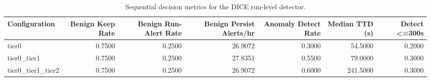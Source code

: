\begin{table}[t]
\centering
\caption{Sequential decision metrics for the DICE run-level detector.}
\label{tab:dice_sequential_metrics}
\footnotesize
\begin{tabular}{lrrrrrr}
\toprule
Configuration & Benign Keep Rate & Benign Run-Alert Rate & Benign Persist Alerts/hr & Anomaly Detect Rate & Median TTD (s) & Detect <=300s \\
\midrule
tier0 & 0.7500 & 0.2500 & 26.9072 & 0.3000 & 54.5000 & 0.2000 \\
tier0_tier1 & 0.7500 & 0.2500 & 27.8351 & 0.5500 & 79.0000 & 0.3000 \\
tier0_tier1_tier2 & 0.7500 & 0.2500 & 26.9072 & 0.6000 & 241.5000 & 0.3000 \\
\bottomrule
\end{tabular}

\end{table}
